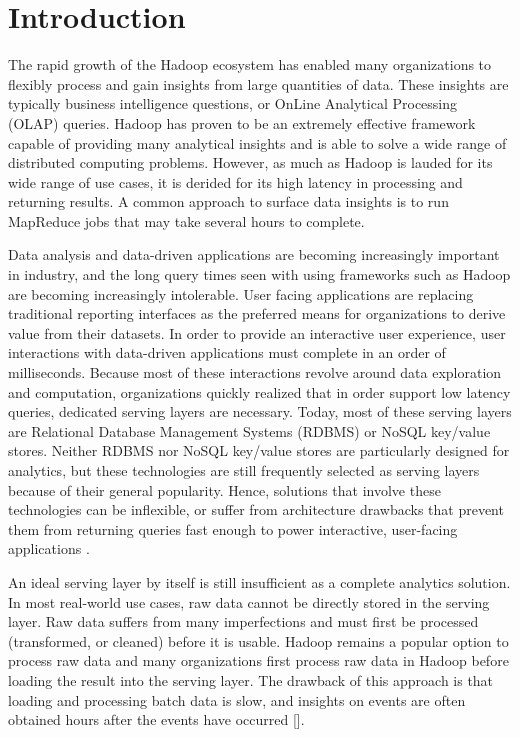 \documentclass{vldb}
\begin{document}
\section{Introduction}
The rapid growth of the Hadoop\cite{shvachko2010hadoop} ecosystem has enabled
many organizations to flexibly process and gain insights from large quantities
of data. These insights are typically business intelligence questions, or
OnLine Analytical Processing (OLAP) queries. Hadoop has proven to be an
extremely effective framework capable of providing many analytical insights and
is able to solve a wide range of distributed computing problems. However, as
much as Hadoop is lauded for its wide range of use cases, it is derided for its
high latency in processing and returning results. A common approach to surface
data insights is to run MapReduce jobs that may take several hours to complete.
 
Data analysis and data-driven applications are becoming increasingly important
in industry, and the long query times seen with using frameworks such as Hadoop
are becoming increasingly intolerable. User facing applications are replacing
traditional reporting interfaces as the preferred means for organizations to
derive value from their datasets. In order to provide an interactive user
experience, user interactions with data-driven applications must complete in an
order of milliseconds. Because most of these interactions revolve around data
exploration and computation, organizations quickly realized that in order
support low latency queries, dedicated serving layers are necessary. Today,
most of these serving layers are Relational Database Management Systems (RDBMS)
or NoSQL key/value stores. Neither RDBMS nor NoSQL key/value stores are
particularly designed for analytics, but these technologies are still
frequently selected as serving layers because of their general popularity.
Hence, solutions that involve these technologies can be inflexible, or suffer
from architecture drawbacks that prevent them from returning queries fast
enough to power interactive, user-facing applications \cite{tschetter2011druid}.

An ideal serving layer by itself is still insufficient as a complete analytics
solution. In most real-world use cases, raw data cannot be directly stored in
the serving layer. Raw data suffers from many imperfections and must first be
processed (transformed, or cleaned) before it is usable. Hadoop remains a
popular option to process raw data and many organizations first process raw
data in Hadoop before loading the result into the serving layer. The drawback
of this approach is that loading and processing batch data is slow, and
insights on events are often obtained hours after the events have occurred [].
 
\end{document}
